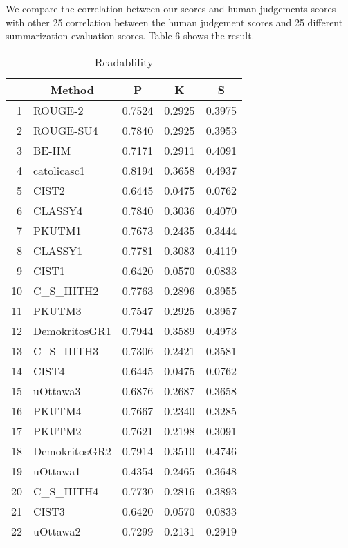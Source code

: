 We compare the correlation between our scores and human judgements scores with 
other 25 correlation between the human judgement scores and 25 different
summarization evaluation scores. Table 6 shows the result.
\begin{table}[h]
    \centering
    \caption{Readablility}
    \begin{tabular}{rlccc}
    \hline
          & \multicolumn{1}{c}{Method} & P     & K     & S \\
    \hline
    1     & ROUGE-2 & 0.7524  & 0.2925  & 0.3975  \\
    2     & ROUGE-SU4 & 0.7840  & 0.2925  & 0.3953  \\
    3     & BE-HM & 0.7171  & 0.2911  & 0.4091  \\
    4     & catolicasc1 & 0.8194  & 0.3658  & 0.4937  \\
    5     & CIST2 & 0.6445  & 0.0475  & 0.0762  \\
    6     & CLASSY4 & 0.7840  & 0.3036  & 0.4070  \\
    7     & PKUTM1 & 0.7673  & 0.2435  & 0.3444  \\
    8     & CLASSY1  & 0.7781  & 0.3083  & 0.4119  \\
    9     & CIST1 & 0.6420  & 0.0570  & 0.0833  \\
    10    & C\_S\_IIITH2 & 0.7763  & 0.2896  & 0.3955  \\
    11    & PKUTM3 & 0.7547  & 0.2925  & 0.3957  \\
    12    & DemokritosGR1 & 0.7944  & 0.3589  & 0.4973  \\
    13    & C\_S\_IIITH3 & 0.7306  & 0.2421  & 0.3581  \\
    14    & CIST4 & 0.6445  & 0.0475  & 0.0762  \\
    15    & uOttawa3 & 0.6876  & 0.2687  & 0.3658  \\
    16    & PKUTM4 & 0.7667  & 0.2340  & 0.3285  \\
    17    & PKUTM2 & 0.7621  & 0.2198  & 0.3091  \\
    18    & DemokritosGR2 & 0.7914  & 0.3510  & 0.4746  \\
    19    & uOttawa1 & 0.4354  & 0.2465  & 0.3648  \\
    20    & C\_S\_IIITH4 & 0.7730  & 0.2816  & 0.3893  \\
    21    & CIST3 & 0.6420  & 0.0570  & 0.0833  \\
    22    & uOttawa2 & 0.7299  & 0.2131  & 0.2919  \\

\end{tabular}
\end{table}
